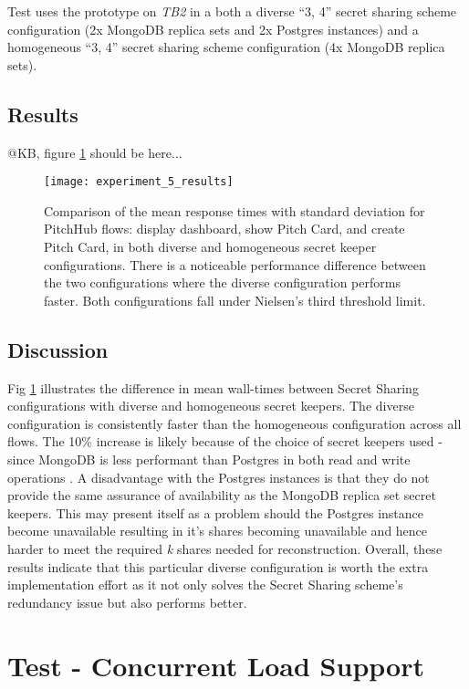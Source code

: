 Test  uses the prototype on \textit{TB2} in a both a diverse ``3, 4'' secret sharing scheme configuration (2x MongoDB replica sets and 2x Postgres instances) and a homogeneous ``3, 4'' secret sharing scheme configuration (4x MongoDB replica sets).

\subsection{Results}

@KB, figure \ref{fig:test_5_results} should be here...

\begin{figure}[ht]
    \centering
    \texttt{[image: experiment\_5\_results]}
    \caption{Comparison of the mean response times with standard deviation for PitchHub flows: display dashboard, show Pitch Card, and create Pitch Card, in both diverse and homogeneous secret keeper configurations. There is a noticeable performance difference between the two configurations where the diverse configuration performs faster. Both configurations fall under Nielsen's third threshold limit.}
    \label{fig:test_5_results}
\end{figure}

\subsection{Discussion}
Fig \ref{fig:test_5_results} illustrates the difference in mean wall-times between Secret Sharing configurations with diverse and homogeneous secret keepers. The diverse configuration is consistently faster than the homogeneous configuration across all flows. The 10\% increase is likely because of the choice of secret keepers used - since MongoDB is less performant than Postgres in both read and write operations \cite{van2012sensor}. 
A disadvantage with the Postgres instances is that they do not provide the same assurance of availability as the MongoDB replica set secret keepers. This may present itself as a problem should the Postgres instance become unavailable resulting in it's shares becoming unavailable and hence harder to meet the required \textit{k} shares needed for reconstruction. 
Overall, these results indicate that this particular diverse configuration is worth the extra implementation effort as it not only solves the Secret Sharing scheme's redundancy issue but also performs better. 

\section{Test  - Concurrent Load Support}
